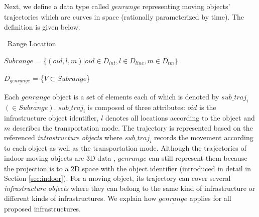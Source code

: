 Next, we define a data type called $\underline{genrange}$ representing moving objects' trajectories which are curves in space (rationally parameterized by time). The definition is given below. 

\begin{Statement}
\label{genrange}
\ Range Location

$Subrange$ = \{$(oid,l,m)|oid\in D_{\underline{int}},
l \in D_{\underline{line}}, m \in D_{\underline{tm}}$\}

$D_{\underline{genrange}}$ = \{$V \subset Subrange$\}

\end{Statement}

Each $\underline{genrange}$ object is a set of elements each of which is denoted by $sub\_traj_i$ $(\in Subrange)$. $sub\_traj_i$ is composed of three attributes: $oid$ is the infrastructure object identifier, $l$ denotes all locations according to the object and $m$ describes the transportation mode. The trajectory is represented based on the referenced \textit{intrastructure objects} where $sub\_traj_i$ records the movement according to each object as well as the transportation mode. Although the trajectories of indoor moving objects are 3D data , 
$\underline{genrange}$ can still represent them because the projection is to a 2D space with the object identifier (introduced in detail in Section \ref{sec:indoor}).
For a moving object, its trajectory can cover several \textit{infrastructure objects} where they can belong to the same kind of infrastructure or different kinds of infrastructures. We explain how $\underline{genrange}$ applies for all proposed infrastructures. \\
